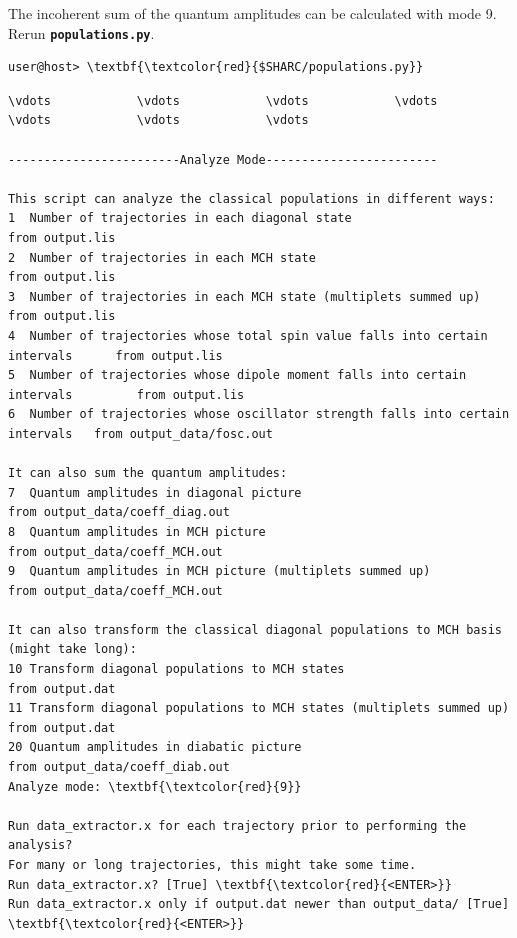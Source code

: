 \documentclass[a4paper,11pt,DIV=15,openany]{scrbook}
\newcommand{\ttt}[1]{\textbf{\texttt{#1}}}
\begin{document}
\normalsize
The incoherent sum of the quantum amplitudes can be calculated with mode 9. Rerun \ttt{populations.py}.
\begin{Verbatim}[commandchars=\\\{\}]
user@host> \textbf{\textcolor{red}{$SHARC/populations.py}}
\end{Verbatim}

\begin{oframed}
\footnotesize\begin{Verbatim}[commandchars=\\\{\}]
\vdots            \vdots            \vdots            \vdots            \vdots            \vdots            \vdots            

------------------------Analyze Mode------------------------

This script can analyze the classical populations in different ways:
1  Number of trajectories in each diagonal state                                   from output.lis
2  Number of trajectories in each MCH state                                        from output.lis
3  Number of trajectories in each MCH state (multiplets summed up)                 from output.lis
4  Number of trajectories whose total spin value falls into certain intervals      from output.lis
5  Number of trajectories whose dipole moment falls into certain intervals         from output.lis
6  Number of trajectories whose oscillator strength falls into certain intervals   from output_data/fosc.out

It can also sum the quantum amplitudes:
7  Quantum amplitudes in diagonal picture                                     from output_data/coeff_diag.out
8  Quantum amplitudes in MCH picture                                          from output_data/coeff_MCH.out
9  Quantum amplitudes in MCH picture (multiplets summed up)                   from output_data/coeff_MCH.out

It can also transform the classical diagonal populations to MCH basis (might take long):
10 Transform diagonal populations to MCH states                               from output.dat
11 Transform diagonal populations to MCH states (multiplets summed up)        from output.dat
20 Quantum amplitudes in diabatic picture                                     from output_data/coeff_diab.out
Analyze mode: \textbf{\textcolor{red}{9}}

Run data_extractor.x for each trajectory prior to performing the analysis?
For many or long trajectories, this might take some time.
Run data_extractor.x? [True] \textbf{\textcolor{red}{<ENTER>}}
Run data_extractor.x only if output.dat newer than output_data/ [True] \textbf{\textcolor{red}{<ENTER>}}


\end{Verbatim}
\end{oframed}
\end{document}
